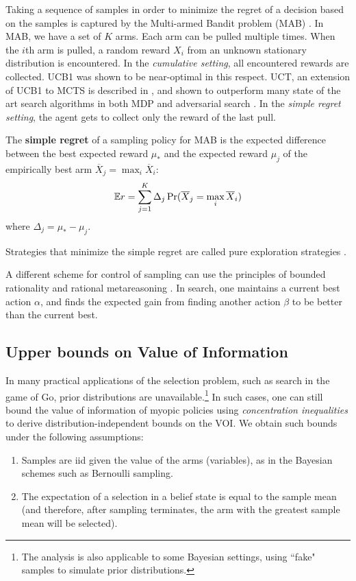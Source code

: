 Taking a sequence of samples in order to minimize the regret of a
decision based on the samples is captured by the Multi-armed Bandit
problem (MAB) \cite{Vermorel.bandits}. In MAB, we have a set of $K$
arms. Each arm can be pulled multiple times. When the $i$th arm is
pulled, a random reward $X_i$ from an unknown stationary distribution
is encountered. In the \textit{cumulative setting}, all encountered rewards are
collected.  UCB1 \cite{Auer.ucb} was shown to be
near-optimal in this respect. UCT, an extension of UCB1 to MCTS is
described in \cite{Kocsis.uct}, and shown to outperform many state of
the art search algorithms in both MDP and adversarial search
\cite{Gelly.mogo,Eyerich.ctp}. In the \textit{simple regret setting}, the agent
gets to collect only the reward of the last pull.
\begin{dfn}
The \textbf{simple regret} of a sampling policy for MAB
is the expected difference between the best expected reward
$\mu_*$ and the expected reward $\mu_j$ of the empirically best arm
$\overline X_j=\max_i\overline X_i$:
\begin{equation}
\mathbb{E} r=\sum_{j=1}^K\Delta_j\Pr(\overline X_j=\max_i\overline X_i)
\label{eqn:simple-regret}
\end{equation}
where $\Delta_j=\mu_*-\mu_j$.
\end{dfn}
Strategies that minimize the simple regret are called pure exploration
strategies \cite{Bubeck.pure}. 

A different scheme for control of sampling can use the principles of
bounded rationality \cite{Horvitz.reasoningabout} and rational
metareasoning \cite{Russell.right}.  In search, one
maintains a current best action $\alpha$, and finds the expected gain
from finding another action $\beta $ to be better than the current
best.

\subsection{Upper bounds on Value of Information}\label{approx-nonbayesian-section}


In many practical applications of the selection problem, such as search in
the game of Go, prior distributions are unavailable.\footnote{The analysis is also applicable to
some Bayesian settings, using ``fake" samples to simulate prior distributions.}
In such cases, one can still bound
the value of information of myopic policies using {\em concentration
inequalities} to derive distribution-independent bounds on the
VOI. We obtain such bounds under the
following assumptions:
\begin{enumerate}
\item Samples are iid given the value of the arms (variables), as in the Bayesian schemes such as Bernoulli
sampling.
\item The expectation of a selection in a belief state is equal to the sample mean (and therefore,
   after sampling terminates, the arm with the greatest sample mean will be selected).
\end{enumerate}

